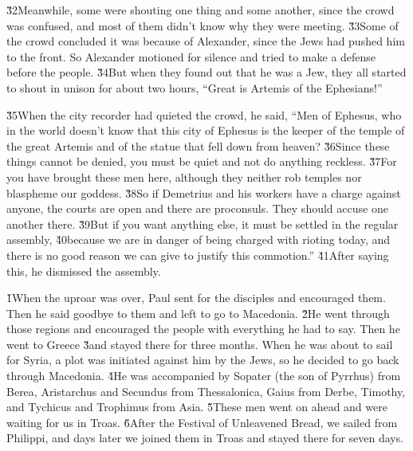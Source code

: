 \v{32}Meanwhile, some were shouting one thing and some another, since the crowd was confused, and most of them didn't know why they were meeting. \v{33}Some of the crowd concluded it was because of Alexander, since the Jews had pushed him to the front. So Alexander motioned for silence and tried to make a defense before the people. \v{34}But when they found out that he was a Jew, they all started to shout in unison for about two hours, ``Great is Artemis of the Ephesians!''

\v{35}When the city recorder had quieted the crowd, he said, ``Men of Ephesus, who in the world doesn't know that this city of Ephesus is the keeper of the temple of the great Artemis and of the statue that fell down from heaven? \v{36}Since these things cannot be denied, you must be quiet and not do anything reckless. \v{37}For you have brought these men here, although they neither rob temples nor blaspheme our goddess. \v{38}So if Demetrius and his workers have a charge against anyone, the courts are open and there are proconsuls. They should accuse one another there. \v{39}But if you want anything else, it must be settled in the regular assembly, \v{40}because we are in danger of being charged with rioting today, and there is no good reason we can give to justify this commotion.'' \v{41}After saying this, he dismissed the assembly.

\v{1}When the uproar was over, Paul sent for the disciples and encouraged them. Then he said goodbye to them and left to go to Macedonia. \v{2}He went through those regions and encouraged the people with everything he had to say. Then he went to Greece \v{3}and stayed there for three months. When he was about to sail for Syria, a plot was initiated against him by the Jews, so he decided to go back through Macedonia. \v{4}He was accompanied by Sopater (the son of Pyrrhus) from Berea, Aristarchus and Secundus from Thessalonica, Gaius from Derbe, Timothy, and Tychicus and Trophimus from Asia. \v{5}These men went on ahead and were waiting for us in Troas. \v{6}After the Festival of Unleavened Bread, we sailed from Philippi, and days later we joined them in Troas and stayed there for seven days.


